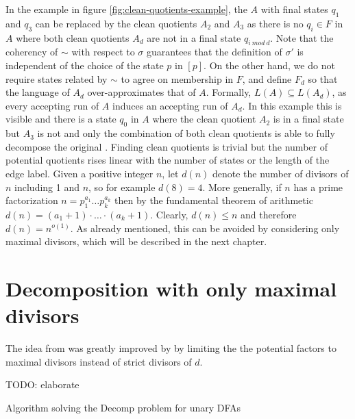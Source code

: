 In the example in figure \ref{fig:clean-quotients-example}, the \DFA $A$ with final states $q_1$ and $q_3$ can be replaced by the clean quotients $A_2$ and $A_3$ as there is no $q_i \in F$ in $A$ where both clean quotients $A_d$ are not in a final state $q_{i ~mod~ d}$. Note that the coherency of $\sim$ with respect to $\sigma$ guarantees that the definition of $\sigma'$ is independent of the choice of the state $p$ in $[p]$. On the other hand, we do not require states related by $\sim$ to agree on membership in $F$, and define $F_d$ so that the language of $A_d$ over-approximates that of $A$. Formally, $L(A) \subseteq L(A_d)$, as every accepting run of $A$ induces an accepting run of $A_d$. In this example this is visible and there is a state $q_0$ in $A$ where the clean quotient $A_2$ is in a final state but $A_3$ is not and only the combination of both clean quotients is able to fully decompose the original \DFA. Finding clean quotients is trivial but the number of potential quotients rises linear with the number of states or the length of the edge label. Given a positive integer $n$, let $d(n)$ denote the number of divisors of $n$ including 1 and $n$, so for example $d(8)=4$. More generally, if $n$ has a prime factorization $n = p_1^{a_1} \ldots p_k^{a_k}$ then by the fundamental theorem of arithmetic $d(n) = (a_1+1) \cdot \ldots \cdot (a_k+1)$. Clearly, $d(n) \leq n$ and therefore $d(n) = n^{o(1)}$. As already mentioned, this can be avoided by considering only maximal divisors, which will be described in the next chapter.

\section{Decomposition with only maximal divisors}
The idea from \cite{prime-languages} was greatly improved by \cite{DBLP:journals/corr/abs-2107-04683} by limiting the the potential factors to maximal divisors instead of strict divisors of $d$.

TODO: elaborate

\begin{algorithm}[H]
	\label{algo:original-composite}
	\DontPrintSemicolon
		
		
		
		\caption{Algorithm solving the Decomp problem for unary DFAs}
\end{algorithm}

